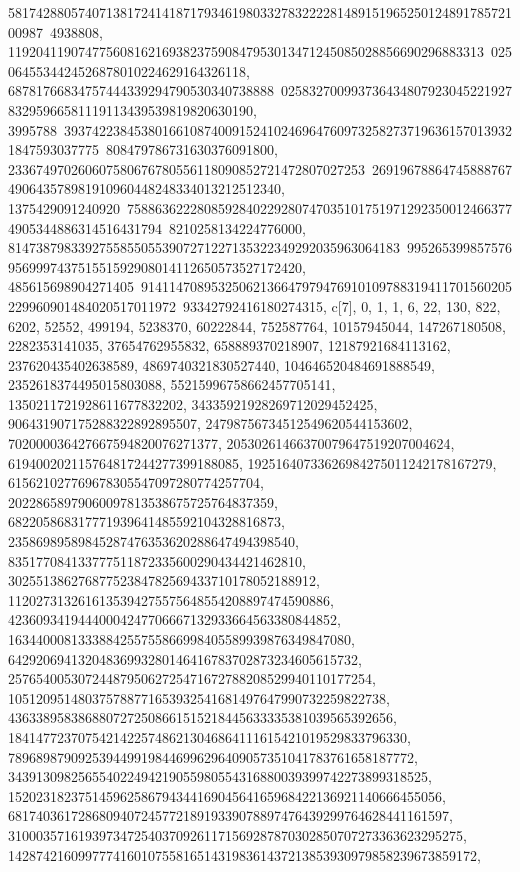 {{{58174288057407138172414187179346198033278322228148915196525012489178572100987\
4938808, 11920411907477560816216938237590847953013471245085028856690296883313\
0250645534424526878010224629164326118, 68781766834757444339294790530340738888\
02583270099373643480792304522192783295966581119113439539819820630190, 3995788\
39374223845380166108740091524102469647609732582737196361570139321847593037775\
808479786731630376091800, 233674970260607580676780556118090852721472807027253\
26919678864745888767490643578981910960448248334013212512340, 1375429091240920\
75886362228085928402292807470351017519712923500124663774905344886314516431794\
8210258134224776000, 81473879833927558550553907271227135322349292035963064183\
995265399857576956999743751551592908014112650573527172420, 485615698904271405\
91411470895325062136647979476910109788319411701560205229960901484020517011972\
93342792416180274315}}, {c[7], {0, 1, 1, 6, 22, 130, 822, 6202, 52552, 
   499194, 5238370, 60222844, 752587764, 10157945044, 147267180508, 
   2282353141035, 37654762955832, 658889370218907, 12187921684113162, 
   237620435402638589, 4869740321830527440, 104646520484691888549, 
   2352618374495015803088, 55215996758662457705141, 
   1350211721928611677832202, 34335921928269712029452425, 
   906431907175288322892895507, 24798756734512549620544153602, 
   702000036427667594820076271377, 20530261466370079647519207004624, 
   619400202115764817244277399188085, 19251640733626984275011242178167279, 
   615621027769678305547097280774257704, 
   20228658979060097813538675725764837359, 
   682205868317771939641485592104328816873, 
   23586989589845287476353620288647494398540, 
   835177084133777511872335600290434421462810, 
   30255138627687752384782569433710178052188912, 
   1120273132616135394275575648554208897474590886, 
   42360934194440004247706667132933664563380844852, 
   1634400081333884255755866998405589939876349847080, 
   64292069413204836993280146416783702873234605615732, 
   2576540053072448795062725471672788208529940110177254, 
   105120951480375788771653932541681497647990732259822738, 
   4363389583868807272508661515218445633335381039565392656, 
   184147723707542142257486213046864111615421019529833796330, 
   7896898790925394499198446996296409057351041783761658187772, 
   343913098256554022494219055980554316880039399742273899318525, 
   15202318237514596258679434416904564165968422136921140666455056, 
   681740361728680940724577218919339078897476439299764628441161597, 
   31000357161939734725403709261171569287870302850707273363623295275, 
   1428742160997774160107558165143198361437213853930979858239673859172, 
}}}

